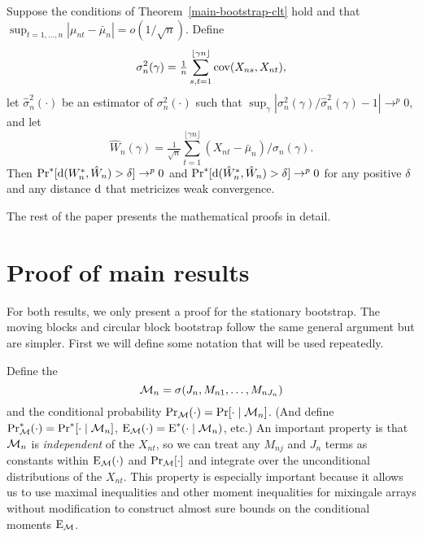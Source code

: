 \documentclass[11pt]{article}
\begin{document}
\begin{cor}
  Suppose the conditions of Theorem~\ref{main-bootstrap-clt} hold and
  that $\sup_{t=1,\dots,n}|\mu_{nt} - \bar \mu_n| = o(1/\sqrt{n})$. Define
  \begin{equation}
    \label{eq:8}
    \sigma_n^2(\gamma) = \tfrac{1}{n}
    \sum_{s,t=1}^{\lfloor \gamma n \rfloor} \operatorname{cov}(X_{ns}, X_{nt}),
  \end{equation}
  let $\hat\sigma_n^2(\cdot)$ be an estimator of $\sigma_n^2(\cdot)$
  such that $\sup_{\gamma} |\sigma_n^2(\gamma) /
  \hat{\sigma}_n^2(\gamma) - 1| \to^p 0$, and let
  \begin{equation}
    \label{eq:9}
    \hat{W}_n(\gamma) = \tfrac{1}{\sqrt{n}} \sum_{t=1}^{\lfloor \gamma
      n \rfloor} (X_{nt} - \bar\mu_n) / \hat{\sigma}_{n}(\gamma).
  \end{equation}
  Then $\operatorname{Pr}^{*}[\operatorname{d}(W_n^{*}, \hat{W}_n) > \delta] \to^p 0$ and
  $\operatorname{Pr}^{*}[\operatorname{d}(\hat{W}_n^{*}, \hat{W}_n) > \delta] \to^p 0$ for any
  positive $\delta$ and any distance $\operatorname{d}$ that metricizes weak
  convergence.
\end{cor}

The rest of the paper presents the mathematical proofs in detail.

\appendix
\section{Proof of main results}

For both results, we only present a proof for the stationary
bootstrap. The moving blocks and circular block bootstrap follow the
same general argument but are simpler. First we will define some
notation that will be used repeatedly.

Define the \sigmafield
\begin{equation}
  \mathcal{M}_n = \sigma(J_{n}, M_{n1},\dots,M_{nJ_n})
\end{equation}
and the conditional probability $\operatorname{Pr}_{\mathcal{M}}(\cdot) = \operatorname{Pr}[\cdot \mid \mathcal{M}_n]$.
(And define $\operatorname{Pr}_{\mathcal{M}}^*(\cdot) = \operatorname{Pr}^*[\cdot \mid \mathcal{M}_n]$, $\operatorname{E}_{\mathcal{M}}(\cdot) =
\operatorname{E}^*(\cdot \mid \mathcal{M}_n)$, etc.) An important property is
that $\mathcal{M}_n$ is \emph{independent} of the $X_{nt}$, so we can treat any
$M_{nj}$ and $J_n$ terms as constants within $\operatorname{E}_{\mathcal{M}}(\cdot)$ and
$\operatorname{Pr}_{\mathcal{M}}[\cdot]$ and integrate over the unconditional distributions of the
$X_{nt}$. This property is especially important because it allows us
to use maximal inequalities and other moment inequalities for
mixingale arrays without modification to construct almost sure bounds on the
conditional moments $\operatorname{E}_{\mathcal{M}}$.
\end{document}
